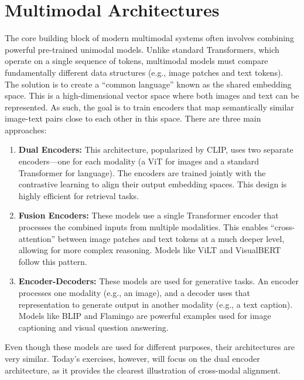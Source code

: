 \section{Multimodal Architectures}
The core building block of modern multimodal systems often involves combining powerful pre-trained unimodal models. Unlike standard Transformers, which operate on a single sequence of tokens, multimodal models must compare fundamentally different data structures (e.g., image patches and text tokens). The solution is to create a ``common language'' known as the shared embedding space. This is a high-dimensional vector space where both images and text can be represented. As such, the goal is to train encoders that map semantically similar image-text pairs close to each other in this space. There are three main approaches:
\begin{enumerate}
\item \textbf{Dual Encoders:} This architecture, popularized by CLIP, uses two separate encoders—one for each modality (a ViT for images and a standard Transformer for language). The encoders are trained jointly with the contrastive learning to align their output embedding spaces. This design is highly efficient for retrieval tasks.

\item \textbf{Fusion Encoders:} These models use a single Transformer encoder that processes the combined inputs from multiple modalities. This enables ``cross-attention'' between image patches and text tokens at a much deeper level, allowing for more complex reasoning. Models like ViLT and VisualBERT follow this pattern.

\item \textbf{Encoder-Decoders:} These models are used for generative tasks. An encoder processes one modality (e.g., an image), and a decoder uses that representation to generate output in another modality (e.g., a text caption). Models like BLIP and Flamingo are powerful examples used for image captioning and visual question answering.
\end{enumerate}
\noindent Even though these models are used for different purposes, their architectures are very similar. Today's exercises, however, will focus on the dual encoder architecture, as it provides the clearest illustration of cross-modal alignment.

